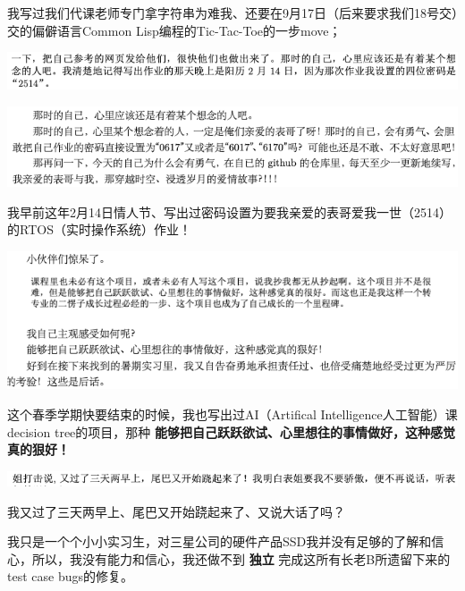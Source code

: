 \documentclass[9pt, b5paper]{article}
\begin{document}
我写过我们代课老师专门拿字符串为难我、还要在9月17日（后来要求我们18号交）交的偏僻语言Common Lisp编程的Tic-Tac-Toe的一步move；

\begin{center}
\includegraphics[width=.9\linewidth]{./pic/backups_plans_20210502_120523.png}
\end{center}

\begin{center}
\includegraphics[width=.9\linewidth]{./pic/backups_plans_20210507_111947.png}
\end{center}

我早前这年2月14日情人节、写出过密码设置为要我亲爱的表哥爱我一世（2514）的RTOS（实时操作系统）作业！

\begin{center}
\includegraphics[width=.9\linewidth]{./pic/backups_plans_20210507_111500.png}
\end{center}

这个春季学期快要结束的时候，我也写出过AI（Artifical Intelligence人工智能）课decision tree的项目，那种 \textbf{能够把自己跃跃欲试、心里想往的事情做好，这种感觉真的狠好！}

\begin{center}
\includegraphics[width=.9\linewidth]{./pic/backups_plans_20210507_112714.png}
\end{center}

我又过了三天两早上、尾巴又开始跷起来了、又说大话了吗？

我只是一个个小小实习生，对三星公司的硬件产品SSD我并没有足够的了解和信心，所以，我没有能力和信心，我还做不到 \textbf{独立} 完成这所有长老B所遗留下来的test case bugs的修复。
\end{document}
